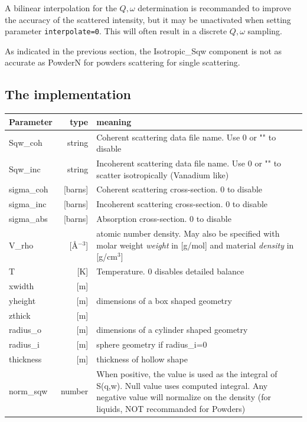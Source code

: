 A bilinear interpolation for the $Q,\omega$ determination is recommanded to improve the accuracy of the scattered intensity, but it may be unactivated when setting parameter \verb+interpolate=0+. This will often result in a discrete $Q,\omega$ sampling.

As indicated in the previous section, the Isotropic\_Sqw component is not as accurate as PowderN for powders scattering for single scattering.

\subsection{The implementation}

\begin{table}
  \begin{center}
  {\let\my=\\
    \begin{tabular}{|lr|p{}|}
    \hline
Parameter & type & meaning \\
    \hline
Sqw\_coh   & string              & Coherent scattering data file name. Use 0 or "" to disable  \\
Sqw\_inc   & string              & Incoherent scattering data file name. Use 0 or "" to scatter isotropically (Vanadium like)  \\
sigma\_coh & [barns]      & Coherent scattering cross-section. 0 to disable \\
sigma\_inc & [barns]      & Incoherent scattering cross-section. 0 to disable \\
sigma\_abs & [barns]      & Absorption cross-section. 0 to disable  \\
V\_rho     & [\AA$^{-3}$] & atomic number density. May also be specified with molar weight \emph{weight} in [g/mol] and material \emph{density} in [g/cm$^3$] \\
T          & [K]          & Temperature. 0 disables detailed balance \\
    \hline
xwidth   & [m] & \\
yheight  & [m] & dimensions of a box shaped geometry \\
zthick   & [m] & \\
radius\_o & [m] & dimensions of a cylinder shaped geometry  \\
radius\_i & [m] & sphere geometry if radius\_i=0  \\
thickness& [m] & thickness of hollow shape  \\
    \hline
norm\_sqw & number  & When positive, the value is used as the integral of S(q,w). Null value uses computed integral. Any negative value will normalize on the density (for liquids, NOT recommanded for Powders) \\

\end{tabular}}
\end{center}
\end{table}
